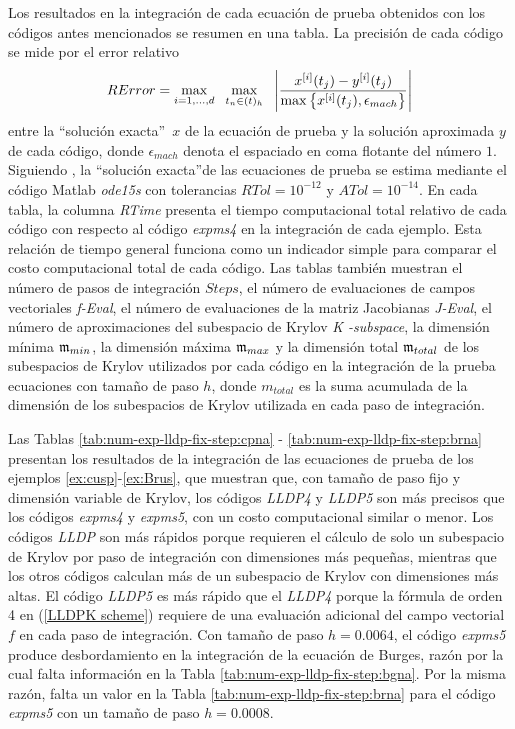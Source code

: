 Los resultados en la integración de cada ecuación de prueba obtenidos con los códigos antes mencionados se resumen en una tabla. La precisión de cada código se mide por el error relativo
\begin{equation}\label{num-exp-lldp-fix-step:ER}
	RError = \max_{i=1,\ldots,d} \;\ \max_{t_n\in(t)_h}  \;\ \left\lvert\frac{x^{[i]}(t_j)-y^{[i]}(t_j)}{\maxx{x^{[i]}(t_j),\epsilon_{mach}}}\right\rvert
\end{equation}
entre la \textquotedblleft solución exacta\textquotedblright~$x$ de la ecuación de prueba y la solución aproximada $y$ de cada código, donde $\epsilon_{mach}$ denota el espaciado en coma flotante del número $1$. Siguiendo \cite{tokman2006efficient}, la \textquotedblleft solución exacta\textquotedblright de las ecuaciones de prueba se estima mediante el código Matlab \textit{ode15s} con tolerancias $RTol=10^{-12}$ y $ATol=10^{-14}$. En cada tabla, la columna \textit{RTime} presenta el tiempo computacional total relativo de cada código con respecto al código \emph{expms4} en la integración de cada ejemplo. Esta relación de tiempo general funciona como un indicador simple para comparar el costo computacional total de cada código. Las tablas también muestran el número de pasos de integración $Steps$, el número de evaluaciones de campos vectoriales \textit{f-Eval}, el número de evaluaciones de la matriz Jacobianas \textit{J-Eval}, el número de aproximaciones del subespacio de Krylov \textit{K -subspace}, la dimensión mínima $\mathfrak{m}_{min}$, la dimensión máxima $\mathfrak{m}_{max}$ y la dimensión total $\mathfrak{m}_{total}$ de los subespacios de Krylov utilizados por cada código en la integración de la prueba ecuaciones con tamaño de paso $h$, donde $m_{total}$ es la suma acumulada de la dimensión de los subespacios de Krylov utilizada en cada paso de integración.

Las Tablas \ref{tab:num-exp-lldp-fix-step:cpna} - \ref{tab:num-exp-lldp-fix-step:brna} presentan los resultados de la integración de las ecuaciones de prueba de los ejemplos \ref{ex:cusp}-\ref{ex:Brus}, que muestran que, con tamaño de paso fijo y dimensión variable de Krylov, los códigos \emph{LLDP4} y \emph{LLDP5} son más precisos que los códigos \emph{expms4} y \emph{expms5}, con un costo computacional similar o menor. Los códigos \emph{LLDP} son más rápidos porque requieren el cálculo de solo un subespacio de Krylov por paso de integración con dimensiones más pequeñas, mientras que los otros códigos calculan más de un subespacio de Krylov con dimensiones más altas. El código \emph{LLDP5} es más rápido que el \emph{LLDP4} porque la fórmula de orden 4 en (\ref{LLDPK scheme}) requiere de una evaluación adicional del campo vectorial $f$ en cada paso de integración. Con tamaño de paso $h = 0.0064$, el código \emph{expms5} produce desbordamiento en la integración de la ecuación de Burges, razón por la cual falta información en la Tabla \ref{tab:num-exp-lldp-fix-step:bgna}. Por la misma razón, falta un valor en la Tabla \ref{tab:num-exp-lldp-fix-step:brna} para el código \emph{expms5} con un tamaño de paso $h = 0.0008$.

